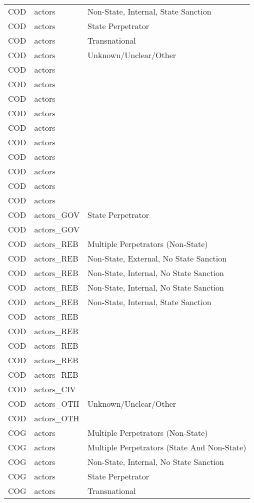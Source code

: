 \begin{table}[ht]
\begin{tabular}{lll}
  COD & actors & Non-State, Internal, State Sanction \\ 
  COD & actors & State Perpetrator \\ 
  COD & actors & Transnational \\ 
  COD & actors & Unknown/Unclear/Other \\ 
  COD & actors &  \\ 
  COD & actors &  \\ 
  COD & actors &  \\ 
  COD & actors &  \\ 
  COD & actors &  \\ 
  COD & actors &  \\ 
  COD & actors &  \\ 
  COD & actors &  \\ 
  COD & actors &  \\ 
  COD & actors &  \\ 
  COD & actors\_GOV & State Perpetrator \\ 
  COD & actors\_GOV &  \\ 
  COD & actors\_REB & Multiple Perpetrators (Non-State) \\ 
  COD & actors\_REB & Non-State, External, No State Sanction \\ 
  COD & actors\_REB & Non-State, Internal, No State Sanction \\ 
  COD & actors\_REB & Non-State, Internal, No State Sanction \\ 
  COD & actors\_REB & Non-State, Internal, State Sanction \\ 
  COD & actors\_REB &  \\ 
  COD & actors\_REB &  \\ 
  COD & actors\_REB &  \\ 
  COD & actors\_REB &  \\ 
  COD & actors\_REB &  \\ 
  COD & actors\_CIV &  \\ 
  COD & actors\_OTH & Unknown/Unclear/Other \\ 
  COD & actors\_OTH &  \\ 
  COG & actors & Multiple Perpetrators (Non-State) \\ 
  COG & actors & Multiple Perpetrators (State And Non-State) \\ 
  COG & actors & Non-State, Internal, No State Sanction \\ 
  COG & actors & State Perpetrator \\ 
  COG & actors & Transnational \\ 

\end{tabular}
\end{table}
